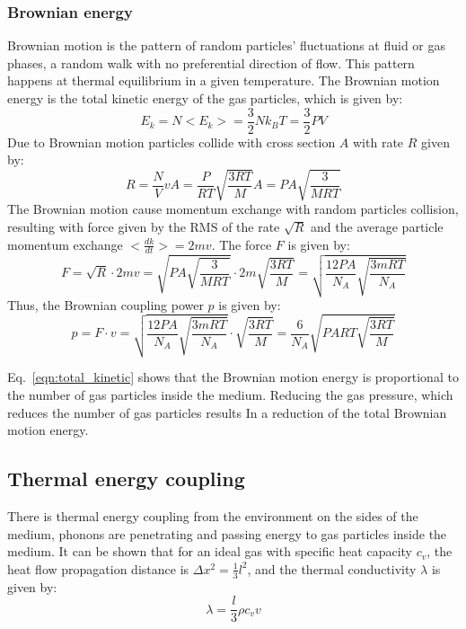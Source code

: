 \documentclass[\main/master.tex]{subfiles}
\begin{document}
\subsubsection{Brownian energy}
Brownian motion is the pattern of random particles' fluctuations at fluid or gas phases, a random walk with no preferential direction of flow. This pattern happens at thermal equilibrium in a given temperature. The  Brownian motion energy is the total kinetic energy of the gas particles, which is given by:
\begin{equation}
E_k = N<E_k> =\frac{3}{2}N k_B T = \frac{3}{2}PV    \label{eqn:total_kinetic}
\end{equation}
Due to Brownian motion particles collide with cross section $A$ with rate $R$ given by:
\begin{equation}
R = \frac{N}{V} v A = \frac{P}{RT} \sqrt{\frac{3RT}{M}} A = PA\sqrt{\frac{3}{MRT}}   \label{eqn:collision rate}
\end{equation}
The Brownian motion cause momentum exchange with random particles collision, resulting with force given by the RMS of the rate $\sqrt{R}$ and the average particle momentum exchange $<\frac{dk}{dt}> =2mv$. The force $F$ is given by: 
\begin{equation}
F  = \sqrt{R}\cdot 2mv= \sqrt{PA\sqrt{\frac{3}{MRT}}}\cdot 2m\sqrt{\frac{3RT}{M}} = \sqrt{\frac{12PA}{N_A}\sqrt{\frac{3mRT}{N_A}} }     \label{eqn:Brownian coupling}
\end{equation}
Thus, the Brownian coupling power $p$ is given by:  
\begin{equation}
p = F\cdot v = \sqrt{\frac{12PA}{N_A}\sqrt{\frac{3mRT}{N_A}} }\cdot\sqrt{\frac{3RT}{M}} = \frac{6}{N_A}\sqrt{PART\sqrt{\frac{3RT}{M}} }
    \label{eqn:Brownian power}
\end{equation}
\par\noindent
Eq.~\ref{eqn:total_kinetic} shows that the Brownian motion energy is proportional to the number of gas particles inside the medium. Reducing the gas pressure, which reduces the number of gas particles results In a reduction of the total Brownian motion energy. 
\subsection{Thermal energy coupling}
There is thermal energy coupling from the environment on the sides of the medium, phonons are penetrating and passing energy to gas particles inside the medium. It can be shown that for an ideal gas with specific heat capacity $c_v$, the heat flow propagation distance is $\Delta x ^2  = \frac{1}{3} l^2 $, and the thermal conductivity $\lambda$ is given by:
\begin{equation}
\lambda  = \frac{l}{3}\rho c_v v    \label{eqn:heat conduction coefficient}
\end{equation}
\end{document}
